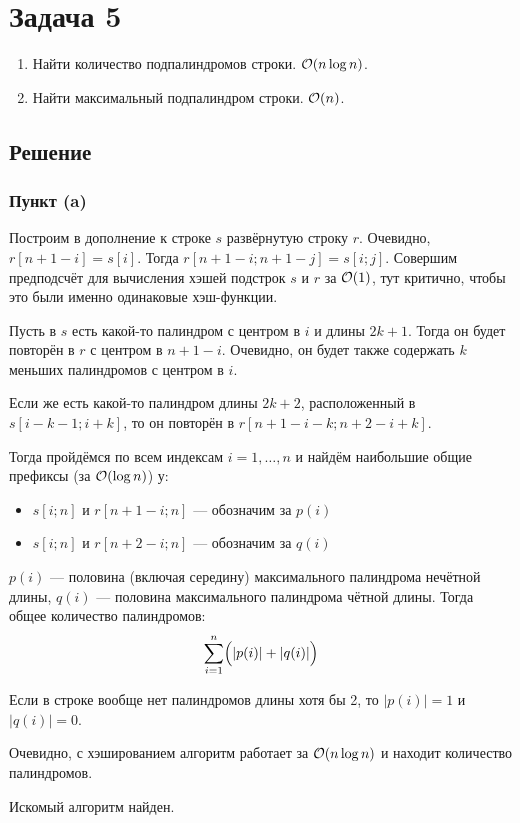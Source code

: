 \section{Задача 5}
\begin{enumerate}
    \item Найти количество подпалиндромов строки. $\mathcal{O}(n \log n)$.
    \item Найти максимальный подпалиндром строки. $\mathcal{O}(n)$.
\end{enumerate}

\subsection{Решение}
\subsubsection{Пункт (a)}
Построим в дополнение к строке $s$ развёрнутую строку $r$.
Очевидно, $r[n + 1 - i] = s[i]$.
Тогда $r[n + 1 - i; n + 1 - j] = s[i; j]$.
Совершим предподсчёт для вычисления хэшей подстрок $s$ и $r$ за $\mathcal{O}(1)$,
тут критично, чтобы это были именно одинаковые хэш-функции.

Пусть в $s$ есть какой-то палиндром с центром в $i$ и длины $2k+1$.
Тогда он будет повторён в $r$ с центром в $n + 1 - i$.
Очевидно, он будет также содержать $k$ меньших палиндромов с центром в $i$.

Если же есть какой-то палиндром длины $2k + 2$,
расположенный в $s[i - k - 1; i + k]$,
то он повторён в $r[n + 1 - i - k; n + 2 - i + k]$.

Тогда пройдёмся по всем индексам $i=1,\ldots,n$
и найдём наибольшие общие префиксы (за $\mathcal{O}(\log n)$) у:
\begin{itemize}
    \item $s[i; n]$ и $r[n + 1 - i; n]$ --- обозначим за $p(i)$
    \item $s[i; n]$ и $r[n + 2 - i; n]$ --- обозначим за $q(i)$
\end{itemize}

$p(i)$ --- половина (включая середину) максимального палиндрома нечётной длины,
$q(i)$ --- половина максимального палиндрома чётной длины.
Тогда общее количество палиндромов:
\[ \sum_{i=1}^n \Bigl( |p(i)| + |q(i)| \Bigr) \]

Если в строке вообще нет палиндромов длины хотя бы 2,
то $|p(i)| = 1$ и $|q(i)| = 0$.

Очевидно, с хэшированием алгоритм работает за $\mathcal{O}(n \log n)$
и находит количество палиндромов.

Искомый алгоритм найден.
